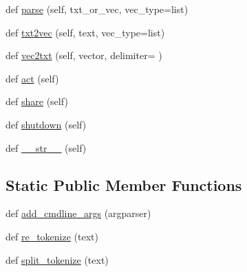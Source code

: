 \begin{DoxyCompactItemize}
\item 
def \hyperlink{classparlai_1_1agents_1_1legacy__agents_1_1seq2seq_1_1dict__v0_1_1DictionaryAgent_a4f1667bb1484f0712678a8f679db6579}{parse} (self, txt\+\_\+or\+\_\+vec, vec\+\_\+type=list)
\item 
def \hyperlink{classparlai_1_1agents_1_1legacy__agents_1_1seq2seq_1_1dict__v0_1_1DictionaryAgent_a5d89ed4dcebcd41853bd0614d30337e7}{txt2vec} (self, text, vec\+\_\+type=list)
\item 
def \hyperlink{classparlai_1_1agents_1_1legacy__agents_1_1seq2seq_1_1dict__v0_1_1DictionaryAgent_a87de974ecf69da7412e777220c29ba39}{vec2txt} (self, vector, delimiter=\textquotesingle{} \textquotesingle{})
\item 
def \hyperlink{classparlai_1_1agents_1_1legacy__agents_1_1seq2seq_1_1dict__v0_1_1DictionaryAgent_ab0369e37e5da8b1d44a95c4765701cdc}{act} (self)
\item 
def \hyperlink{classparlai_1_1agents_1_1legacy__agents_1_1seq2seq_1_1dict__v0_1_1DictionaryAgent_ad1129f2e3f26f6d01fb1f2edfa61342c}{share} (self)
\item 
def \hyperlink{classparlai_1_1agents_1_1legacy__agents_1_1seq2seq_1_1dict__v0_1_1DictionaryAgent_acc5f2818eae15ab8ebe81924600bb6fe}{shutdown} (self)
\item 
def \hyperlink{classparlai_1_1agents_1_1legacy__agents_1_1seq2seq_1_1dict__v0_1_1DictionaryAgent_ae380876d4ad2c7292e8610985ff2184d}{\+\_\+\+\_\+str\+\_\+\+\_\+} (self)
\end{DoxyCompactItemize}
\subsection*{Static Public Member Functions}
\begin{DoxyCompactItemize}
\item 
def \hyperlink{classparlai_1_1agents_1_1legacy__agents_1_1seq2seq_1_1dict__v0_1_1DictionaryAgent_afa68d3dfd4b59fdfe7304b0153c18f03}{add\+\_\+cmdline\+\_\+args} (argparser)
\item 
def \hyperlink{classparlai_1_1agents_1_1legacy__agents_1_1seq2seq_1_1dict__v0_1_1DictionaryAgent_a11a20a1798b9c939e2b7347b9d799e7b}{re\+\_\+tokenize} (text)
\item 
def \hyperlink{classparlai_1_1agents_1_1legacy__agents_1_1seq2seq_1_1dict__v0_1_1DictionaryAgent_a8c2c9af5d9d826650a2dcf0fe6adf2ec}{split\+\_\+tokenize} (text)
\end{DoxyCompactItemize}
